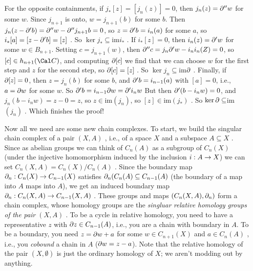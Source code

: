 \ssk

For the opposite containments,
if $j_*[z]=[j_n(z)]=0$, then $j_n(z)=\partial^{\prime\prime}w$ for some $w$. 
Since $j_{n+1}$ is onto, $w=j_{n+1}(b)$ for some $b$. Then 
$j_n(z-\partial^\prime b) = \partial^{\prime\prime} w-\partial^{\prime\prime} j_{n+1} b = 0$, so 
$z=\partial^\prime b = i_n(a)$ for some $a$, so $i_*[a] = [z-\partial^\prime b] = [z]$ . 
So $\ker j_*\subseteq$im$i_*$ . If $i_*[z]=0$, then $i_n(z)=\partial^\prime w$ for some $w\in B_{n+1}$.
Setting $c=j_{n+1}(w)$, then $\partial^{\prime\prime} c = j_n \partial^\prime w - i_n i_n(Z) = 0$, so 
$[c]\in h_{n+1}({\Cal C})$, and computing $\partial [c]$ we find that we can choose $w$ for the 
first step and $z$ for the second step, so $\partial [c] = [z]$ . So $\ker j_n\subseteq$im$\partial$ .
Finally, if $\partial [z] = 0$, then $z=j_n(b)$ for some $b$, and $\partial^\prime b = i_{n-1}(a)$ with
$[a]=0$, i.e., $a=\partial w$ for some $w$. So $\partial^\prime b = i_{n-1}\partial w = \partial^\prime i_n w$ But
then $\partial^\prime (b-i_n w) = 0$, and 
$j_n(b-i_n w) = z-0 = z$, so $z\in$im$(j_n)$, so $[z]\in$im$(j_*)$ . So 
$\ker\partial\subseteq$im$(j_n)$ . Which finishes the proof!

\msk

Now all we need are some new chain complexes. To start, we build the singular chain complex
of a pair $(X,A)$ , i.e., of a space $X$ and a subspace $A\subseteq X$ .
Since as abelian groups we can think of 
$C_n(A)$ as a subgroup of $C_n(X)$ (under the injective homomorphism induced by the 
inclusion $i:A\rightarrow X$) we can set $C_n(X,A)= C_n(X)/C_n(A)$ . Since the
boundary map $\partial_n:C_n(X)\rightarrow C_{n-1}(X)$ satisfies
$\partial_n(C_n(A)\subseteq C_{n-1}(A)$ (the boundary of a map into $A$ maps into $A$),
we get an induced boundary map $\partial_n:C_n(X,A)\rightarrow C_{n-1}(X,A)$ . These
groups and maps $(C_n(X,A),\partial_n)$ form a chain complex, whose homology groups 
are the {\it singluar relative homology groups of the pair} $(X,A)$ . To be a cycle
in relative homology, you need to have a representative $z$ with $\partial z\in C_{n-1}(A)$,
i.e., you are a chain with boundary in $A$. To be a boundary, you need
$z=\partial w +a$ for some $w\in C_{n+1}(X)$ and $a\in C_n(A)$ , i.e., you {\it cobound}
a chain in $A$ ($\partial w = z-a$). Note that the relative homology of the pair $(X,\emptyset)$
is just the ordinary homology of $X$; we aren't modding out by anything.

\ssk


